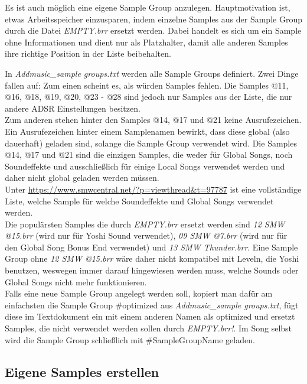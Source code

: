 Es ist auch möglich eine eigene Sample Group anzulegen. Hauptmotivation ist, etwas Arbeitsspeicher einzusparen, indem einzelne Samples aus der Sample Group durch die Datei \textit{EMPTY.brr} ersetzt werden. Dabei handelt es sich um ein Sample ohne Informationen und dient nur als Platzhalter, damit alle anderen Samples ihre richtige Position in der Liste beibehalten.

\bigskip

In \textit{Addmusic\_sample groups.txt} werden alle Sample Groups definiert. Zwei Dinge fallen auf: Zum einen scheint es, als würden Samples fehlen. Die Samples @11, @16, @18, @19, @20, @23 - @28 sind jedoch nur Samples aus der Liste, die nur andere ADSR Einstellungen besitzen. \\

Zum anderen stehen hinter den Samples @14, @17 und @21 keine Ausrufezeichen. Ein Ausrufezeichen hinter einem Samplenamen bewirkt, dass diese global (also dauerhaft) geladen sind, solange die Sample Group verwendet wird. Die Samples @14, @17 und @21 sind die einzigen Samples, die weder für Global Songs, noch Soundeffekte und ausschließlich für einige Local Songs verwendet werden und daher nicht global geladen werden müssen. \\
Unter \href{https://www.smwcentral.net/?p=viewthread\&t=97787}{https://www.smwcentral.net/?p=viewthread\&t=97787} ist eine vollständige Liste, welche Sample für welche Soundeffekte und Global Songs verwendet werden. \\
Die populärsten Samples die durch \textit{EMPTY.brr} ersetzt werden sind \textit{12 SMW @15.brr} (wird nur für Yoshi Sound verwendet), \textit{09 SMW @7.brr} (wird nur für den Global Song Bonus End verwendet) und \textit{13 SMW Thunder.brr}. Eine Sample Group ohne \textit{12 SMW @15.brr} wäre daher nicht kompatibel mit Leveln, die Yoshi benutzen, weswegen immer darauf hingewiesen werden muss, welche Sounds oder Global Songs nicht mehr funktionieren. \\
Falls eine neue Sample Group angelegt werden soll, kopiert man dafür am einfachsten die Sample Group \#optimized aus \textit{Addmusic\_sample groups.txt}, fügt diese im Textdokument ein mit einem anderen Namen als optimized und ersetzt Samples, die nicht verwendet werden sollen durch \textit{\dq EMPTY.brr\dq{}!}. Im Song selbst wird die Sample Group schließlich mit \#SampleGroupName geladen.

\subsection{Eigene Samples erstellen}
